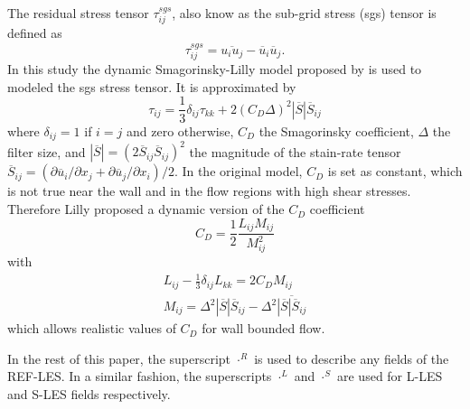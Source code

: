 The residual stress tensor $\tau_{ij}^{sgs}$, also know as the sub-grid stress (sgs) tensor is defined as
\begin{equation}
\tau_{ij}^{sgs}=\overline{u_i u_j}-\overline{u}_i\overline{u}_j.
\end{equation}
In this study the dynamic Smagorinsky-Lilly model proposed by \cite{Lilly1992} is used to modeled the sgs stress tensor. It is approximated by
\begin{equation}\label{equ: sgs model}
\tau_{ij}=\frac{1}{3}\delta_{ij}\tau_{kk}+2(C_{D}\Delta)^2\left| \overline{S} \right|\overline{S}_{ij}
\end{equation}
where $\delta_{ij}=1$ if $i=j$ and zero otherwise, $C_{D}$ the Smagorinsky coefficient, $\Delta$ the filter size, and $\left|\overline{S}\right|=(2\overline{S}_{ij}\overline{S}_{ij})^2$ the magnitude of the stain-rate tensor $\overline{S}_{ij}=\left(\partial\overline{u}_i/\partial  x_j+\partial\overline{u}_j/\partial x_i \right)/2$. In the original model, $C_{D}$ is set as constant, which is not true near the wall and in the flow regions with  high shear stresses. Therefore Lilly proposed a dynamic version of the $C_D$ coefficient
\begin{equation}
C_D=\frac{1}{2}\frac{L_{ij}M_{ij}}{M_{ij}^2}
\label{equ: dynamic Cd coefficient}
\end{equation}
with
\begin{subequations}\label{subequ: Lij and Mij}
	\begin{gather}
		L_{ij}-\frac{1}{3}\delta_{ij}L_{kk}=2C_{D}M_{ij}
		\label{equ: Lij}
		\\
		M_{ij}=\Delta^2\left| \overline{S} \right|\overline{S}_{ij}-\Delta^2\overline{\left| \overline{S} \right|\overline{S}_{ij}}
		\label{equ: Mij}
	\end{gather}
\end{subequations}
which allows realistic values of $C_D$ for wall bounded flow. 

In the rest of this paper, the superscript $\cdot^R$ is used to describe any fields of the REF-LES. In a similar fashion, the superscripts $\cdot^L$ and $\cdot^S$ are used for L-LES and S-LES fields respectively.

